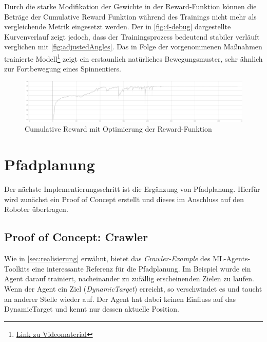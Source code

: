 Durch die starke Modifikation der Gewichte in der Reward-Funktion können die Beträge der Cumulative Reward Funktion während des Trainings nicht mehr als vergleichende Metrik eingesetzt werden.
Der in \autoref{fig:4-debug} dargestellte Kurvenverlauf zeigt jedoch, dass der Trainingsprozess bedeutend stabiler verläuft verglichen mit \autoref{fig:adjustedAngles}.
Das in Folge der vorgenommenen Maßnahmen trainierte Modell\footnote{\href{https://github.com/yschiebelhut/studienarbeit-doc/raw/master/Videos/SpiderBotDemos/4-debug-extended-vector-size.webm}{Link zu Videomaterial}} zeigt ein erstaunlich natürliches Bewegungsmuster, sehr ähnlich zur Fortbewegung eines Spinnentiers.

\begin{figure}
    
\end{figure}


\begin{figure}
    \centering
    \includegraphics[width=\textwidth]{Bilder/ml-agents/Environment_Cumulative Reward-4-debug-extended-vector-space.pdf}
    \caption{Cumulative Reward mit Optimierung der Reward-Funktion}
    \label{fig:4-debug}
\end{figure}


\section{Pfadplanung}
Der nächste Implementierungsschritt ist die Ergänzung von Pfadplanung.
Hierfür wird zunächst ein Proof of Concept erstellt und dieses im Anschluss auf den Roboter übertragen.

\subsection{Proof of Concept: Crawler}
Wie in \autoref{sec:realisierung} erwähnt, bietet das \emph{Crawler-Example} des ML-Agents-Toolkits eine interessante Referenz für die Pfadplanung.
Im Beispiel wurde ein Agent darauf trainiert, nacheinander zu zufällig erscheinenden Zielen zu laufen.
Wenn der Agent ein Ziel (\emph{DynamicTarget}) erreicht, so verschwindet es und taucht an anderer Stelle wieder auf.
Der Agent hat dabei keinen Einfluss auf das DynamicTarget und kennt nur dessen aktuelle Position.

